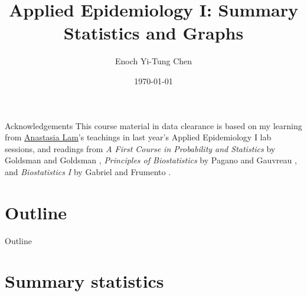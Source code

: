


\title[Applied Epi I: Summary Statistics and Graphs]{Applied Epidemiology I: Summary Statistics and Graphs}
\date{\today}
\author[Enoch Yi-Tung Chen]{Enoch Yi-Tung Chen}




\begin{frame}
\maketitle 
\end{frame}

\begin{frame}{Acknowledgements}
This course material in data clearance is based on my learning from \href{https://staff.ki.se/people/analam}{Anastasia Lam}'s teachings in last year's Applied Epidemiology I lab sessions, and readings from \textit{A First Course in Probability and Statistics} by Goldsman and Goldsman \cite{Goldsman2020}, \textit{Principles of Biostatistics} by Pagano and Gauvreau \cite{Pagano2000}, and \textit{Biostatistics I} by Gabriel and Frumento \cite{Gabriel2020}.
\end{frame}

\section*{Outline}
\begin{frame}{Outline}
          \tableofcontents
\end{frame}

\section{Summary statistics}
